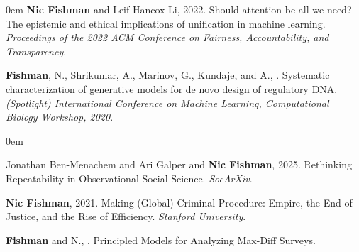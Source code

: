 \begin{cvparagraph}
\begin{addmargin}[2em]{0em}
\textbf{Nic Fishman} and Leif Hancox-Li, 2022. Should attention be all we need? The epistemic and ethical implications of unification in machine learning. \textit{Proceedings of the 2022 ACM Conference on Fairness, Accountability, and Transparency}.

\textbf{Fishman}, N., Shrikumar, A., Marinov, G., Kundaje, and A., . Systematic characterization of generative models for de novo design of regulatory DNA. \textit{(Spotlight) International Conference on Machine Learning, Computational Biology Workshop, 2020}.

\end{addmargin}


\begin{addmargin}[2em]{0em}

Jonathan Ben-Menachem and Ari Galper and \textbf{Nic Fishman}, 2025. Rethinking Repeatability in Observational Social Science. \textit{SocArXiv}.

\textbf{Nic Fishman}, 2021. Making (Global) Criminal Procedure: Empire, the End of Justice, and the Rise of Efficiency. \textit{Stanford University}.

\textbf{Fishman} and N., . Principled Models for Analyzing Max-Diff Surveys.

\end{addmargin}

\end{cvparagraph}
